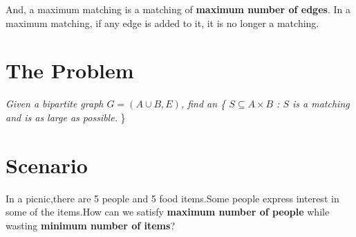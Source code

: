 \documentclass[18pt]{article}
\begin{document}
And, a maximum matching is a matching of \textbf{maximum number of edges}. In a maximum matching, if any edge is added to it, it is no longer a matching.

\section{The Problem}
\textit{
Given a bipartite graph $G = (A \cup B, E)$, find an \{ $S \subseteq A \times B$ : $S$ is a matching and is as large as possible.} \} \cite{kleinberg2006algorithm}

\newpage

\section{Scenario}
In a picnic,there are 5 people and 5 food items.Some people express interest in some of the items.How can we satisfy \textbf{maximum number of people} while wasting \textbf{minimum number of items}?
\end{document}
